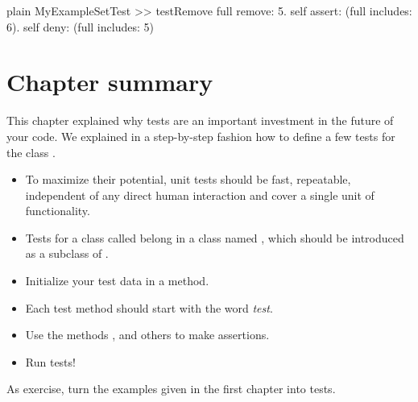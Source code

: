 \documentclass[10pt,twoside,english]{_support/latex/sbabook/sbabook}
\begin{document}
\begin{displaycode}{plain}
MyExampleSetTest >> testRemove
	full remove: 5.
	self assert: (full includes: 6).
	self deny: (full includes: 5)
\end{displaycode}
\section{Chapter summary}
This chapter explained why tests are an important investment in the future of
your code. We explained in a step-by-step fashion how to define a few tests for
the class . 

\begin{itemize}
\item To maximize their potential, unit tests should be fast, repeatable, independent of any direct human interaction and cover a single unit of functionality.
\item Tests for a class called  belong in a class named , which should be introduced as a subclass of .
\item Initialize your test data in a  method.
\item Each test method should start with the word \textit{test}.
\item Use the  methods ,  and others to make assertions.
\item Run tests!
\end{itemize}

As exercise, turn the examples given in the first chapter into tests.



\backmatter



\end{document}
